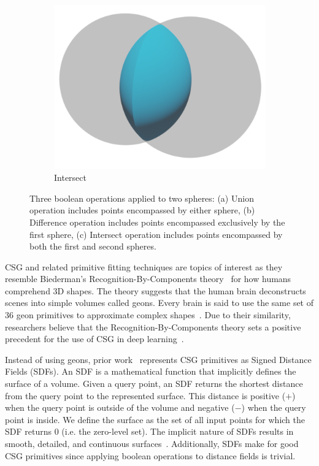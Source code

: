\begin{figure}
\begin{subfigure}[t]{0.3\textwidth}
		\includegraphics[width=\textwidth]{Images/Intersect}
		\caption{Intersect}
	\end{subfigure}
	\caption{Three boolean operations applied to two spheres: (a) Union operation includes points encompassed by either sphere, (b) Difference operation includes points encompassed exclusively by the first sphere, (c) Intersect operation includes points encompassed by both the first and second spheres.}
	\label{fig:boolean operations}
\end{figure}

CSG and related primitive fitting techniques are topics of interest as they resemble Biederman's Recognition-By-Components theory~\cite{Biederman1987} for how humans comprehend 3D shapes. The theory suggests that the human brain deconstructs scenes into simple volumes called geons. Every brain is said to use the same set of 36 geon primitives to approximate complex shapes~\cite{Biederman1987}. Due to their similarity, researchers believe that the Recognition-By-Components theory sets a positive precedent for the use of CSG in deep learning~\cite{Sharma2018}.

Instead of using geons, prior work~\cite{Sharma2018, Kania2020, Ren2021} represents CSG primitives as Signed Distance Fields (SDFs). An SDF is a mathematical function that implicitly defines the surface of a volume. Given a query point, an SDF returns the shortest distance from the query point to the represented surface. This distance is positive ($+$) when the query point is outside of the volume and negative ($-$) when the query point is inside. We define the surface as the set of all input points for which the SDF returns 0 (i.e. the zero-level set). The implicit nature of SDFs results in smooth, detailed, and continuous surfaces~\cite{Park2019}. Additionally, SDFs make for good CSG primitives since applying boolean operations to distance fields is trivial.

